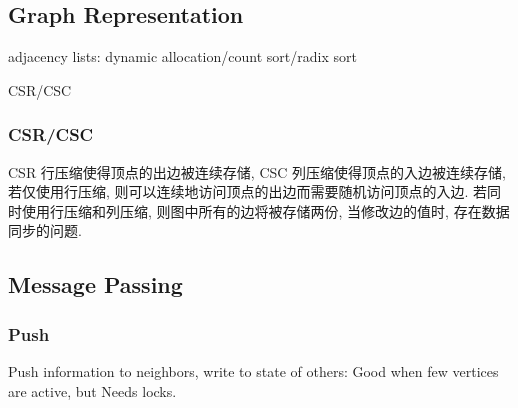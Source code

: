 \documentclass[UTF8,12pt,a4paper]{article}
\begin{document}
\subsection{Graph Representation}
\begin{compactitem}
  \item adjacency lists: dynamic allocation/count sort/radix sort
  \item CSR/CSC
\end{compactitem}
\subsubsection{CSR/CSC}
CSR 行压缩使得顶点的出边被连续存储, CSC 列压缩使得顶点的入边被连续存储,
若仅使用行压缩, 则可以连续地访问顶点的出边而需要随机访问顶点的入边.
若同时使用行压缩和列压缩, 则图中所有的边将被存储两份,
当修改边的值时, 存在数据同步的问题.

\subsection{Message Passing}
\subsubsection{Push}
Push information to neighbors, write to state of others:
Good when few vertices are active, but Needs locks.
\end{document}
